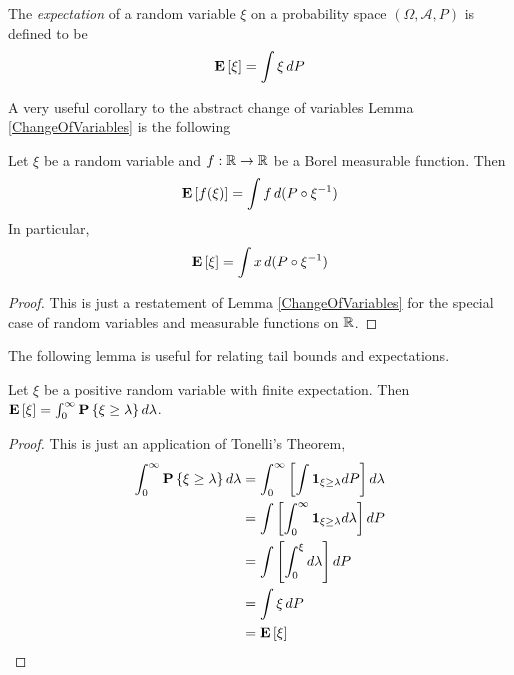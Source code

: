 \begin{defn}The \emph{expectation} of a random variable $\xi$ on a
  probability space $(\Omega, \mathcal{A}, P)$ is
  defined to be 
\begin{align*}
\textbf{E}\left[\xi\right] = \int \xi \, dP
\end{align*}
\end{defn}
A very useful corollary to the abstract change of variables Lemma
\ref{ChangeOfVariables} is the following
\begin{lem}\label{ExpectationRule}Let $\xi$ be a random variable and $f: \mathbb{R} \to \mathbb{R}$
  be a Borel measurable function.  Then 
\begin{align*}
\textbf{E}\left[f(\xi)\right] = \int f \, d (P \circ \xi^{-1})
\end{align*}
In particular, 
\begin{align*}
\textbf{E}\left[\xi\right] = \int x \, d (P \circ \xi^{-1})
\end{align*}
\end{lem}
\begin{proof}This is just a restatement of Lemma
  \ref{ChangeOfVariables} for the special case of random variables and
  measurable functions on $\mathbb{R}$.
\end{proof}

The following lemma is useful for relating tail bounds and expectations.
\begin{lem}\label{TailsAndExpectations}Let $\xi$ be a positive random variable with finite
  expectation.  Then $\textbf{E}\left[\xi\right] = \int_0^\infty \textbf{P}\left \{\xi \geq
    \lambda \right \} d\lambda$.
\end{lem}
\begin{proof}
This is just an application of Tonelli's Theorem,
\begin{align*}
\int_0^\infty \textbf{P}\left \{\xi \geq \lambda \right \}d\lambda &= \int_0^\infty \left[\int
\textbf{1}_{\xi \geq \lambda} dP\right] d\lambda \\
&= \int\left[\int_0^\infty \textbf{1}_{\xi \geq \lambda} d\lambda\right] dP \\
&= \int\left[\int_0^{\xi} d\lambda\right] dP \\
&= \int \xi \, dP \\
&= \textbf{E}\left[\xi\right] \\
\end{align*}
\end{proof}

